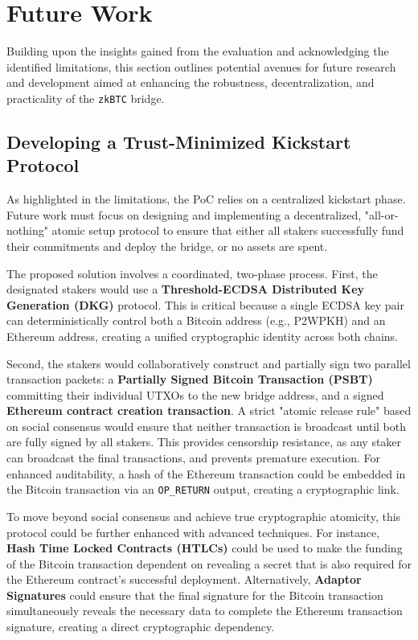\documentclass{DESSThesis}
\newcommand{\zktoken}{\texttt{zkBTC}}
\begin{document}
\section{Future Work}
Building upon the insights gained from the evaluation and acknowledging the identified limitations, this section outlines potential avenues for future research and development aimed at enhancing the robustness, decentralization, and practicality of the \texttt{\zktoken} bridge.

\subsection{Developing a Trust-Minimized Kickstart Protocol} \label{subsec:trust_minimized_kickstart}
As highlighted in the limitations, the PoC relies on a centralized kickstart phase. Future work must focus on designing and implementing a decentralized, "all-or-nothing" atomic setup protocol to ensure that either all stakers successfully fund their commitments and deploy the bridge, or no assets are spent.

The proposed solution involves a coordinated, two-phase process. First, the designated stakers would use a \textbf{Threshold-ECDSA Distributed Key Generation (DKG)} protocol. This is critical because a single ECDSA key pair can deterministically control both a Bitcoin address (e.g., P2WPKH) and an Ethereum address, creating a unified cryptographic identity across both chains.

Second, the stakers would collaboratively construct and partially sign two parallel transaction packets: a \textbf{Partially Signed Bitcoin Transaction (PSBT)} committing their individual UTXOs to the new bridge address, and a signed \textbf{Ethereum contract creation transaction}. A strict "atomic release rule" based on social consensus would ensure that neither transaction is broadcast until both are fully signed by all stakers. This provides censorship resistance, as any staker can broadcast the final transactions, and prevents premature execution. For enhanced auditability, a hash of the Ethereum transaction could be embedded in the Bitcoin transaction via an \texttt{OP\_RETURN} output, creating a cryptographic link.

To move beyond social consensus and achieve true cryptographic atomicity, this protocol could be further enhanced with advanced techniques. For instance, \textbf{Hash Time Locked Contracts (HTLCs)} could be used to make the funding of the Bitcoin transaction dependent on revealing a secret that is also required for the Ethereum contract's successful deployment. Alternatively, \textbf{Adaptor Signatures} could ensure that the final signature for the Bitcoin transaction simultaneously reveals the necessary data to complete the Ethereum transaction signature, creating a direct cryptographic dependency.
\end{document}

